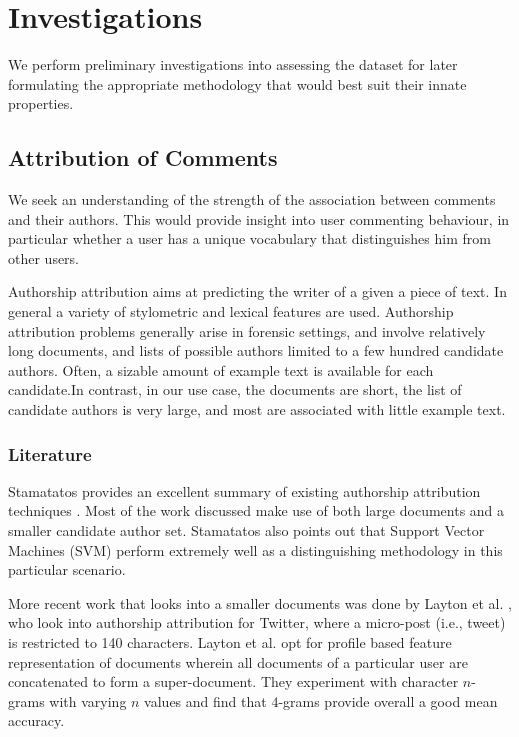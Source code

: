 \chapter{Investigations}
\label{chap:inv}
We perform preliminary investigations into assessing the dataset for later formulating the appropriate methodology that would best suit their innate properties.

\section{Attribution of Comments}
We seek an understanding of the strength of the association between comments and their authors. This would provide insight into user commenting behaviour, in particular whether a user has a unique vocabulary that distinguishes him from other users.

Authorship attribution aims at predicting the writer of a given a piece of text. In general a variety of stylometric and lexical features are used. Authorship attribution problems generally arise in forensic settings, and involve relatively long documents, and lists of possible authors limited to a few hundred candidate authors. Often, a sizable amount of example text is available for each candidate.In contrast, in our use case, the documents are short, the list of candidate authors is very large, and most are associated with little example text.                                          

\subsection{Literature}
Stamatatos provides an excellent summary of existing authorship attribution techniques \cite{stamatatos_survey_2009}. Most of the work discussed make use of both large documents and a smaller candidate author set. Stamatatos also points out that Support Vector Machines (SVM) perform extremely well as a distinguishing methodology in this particular scenario.

More recent work that looks into a smaller documents was done by Layton et al. \cite{layton_authorship_2010}, who look into authorship attribution for Twitter, where a micro-post (i.e., tweet) is restricted to 140 characters. Layton et al. opt for profile based feature representation of documents wherein all documents of a particular user are concatenated to form a super-document. They experiment with character $n$-grams with varying $n$ values and find that $4$-grams provide overall a good mean accuracy.

